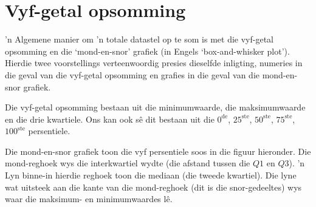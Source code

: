 \section{Vyf-getal opsomming}
’n Algemene manier om ’n totale datastel op te som is met die vyf-getal opsomming en die ‘mond-en-snor’ grafiek (in Engels ‘box-and-whisker plot’). Hierdie twee voorstellings verteenwoordig presies dieselfde inligting, numeries in die geval van die vyf-getal opsomming en grafies in die geval van die mond-en-snor grafiek.

\par
Die vyf-getal opsomming bestaan uit die minimumwaarde, die maksimumwaarde en die drie kwartiele. Ons kan ook sê dit bestaan uit die $0^{\mathrm{de}}$,
$25^{\mathrm{ste}}$, $50^{\mathrm{ste}}$, $75^{\mathrm{ste}}$, $100^{\mathrm{ste}}$ persentiele.

Die mond-en-snor grafiek toon die vyf persentiele soos in die figuur hieronder. Die mond-reghoek wys die interkwartiel wydte (die afstand tussen die  $Q1$ en $Q3$). ’n Lyn binne-in hierdie reghoek toon die mediaan (die tweede kwartiel). Die lyne wat uitsteek aan die kante van die mond-reghoek (dit is die snor-gedeeltes) wys waar die maksimum- en minimumwaardes lê. 
\par
{}
\clearpage
\begin{figure}[t]
  \begin{center}
  \end{center}
\end{figure}
\vspace{1cm}

